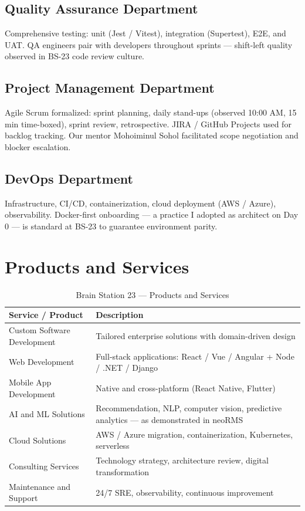 \subsection{Quality Assurance Department}
Comprehensive testing: unit (Jest / Vitest), integration (Supertest), E2E, and UAT. QA engineers pair with developers throughout sprints --- shift-left quality observed in BS-23 code review culture.

\subsection{Project Management Department}
Agile Scrum formalized: sprint planning, daily stand-ups (observed 10:00 AM, 15 min time-boxed), sprint review, retrospective. JIRA / GitHub Projects used for backlog tracking. Our mentor Mohoiminul Sohol facilitated scope negotiation and blocker escalation.

\subsection{DevOps Department}
Infrastructure, CI/CD, containerization, cloud deployment (AWS / Azure), observability. Docker-first onboarding --- a practice I adopted as architect on Day 0 --- is standard at BS-23 to guarantee environment parity.

\section{Products and Services}
\label{sec:products}

\begin{table}[H]
\centering
\caption{Brain Station 23 --- Products and Services}
\label{tab:bs23_services}
\begin{tabularx}{\textwidth}{@{}p{}X@{}}
\toprule
\textbf{Service / Product} & \textbf{Description} \\
\midrule
Custom Software Development & Tailored enterprise solutions with domain-driven design \\
Web Development & Full-stack applications: React / Vue / Angular + Node / .NET / Django \\
Mobile App Development & Native and cross-platform (React Native, Flutter) \\
AI and ML Solutions & Recommendation, NLP, computer vision, predictive analytics --- as demonstrated in neoRMS \\
Cloud Solutions & AWS / Azure migration, containerization, Kubernetes, serverless \\
Consulting Services & Technology strategy, architecture review, digital transformation \\
Maintenance and Support & 24/7 SRE, observability, continuous improvement \\
\bottomrule
\end{tabularx}
\end{table}

